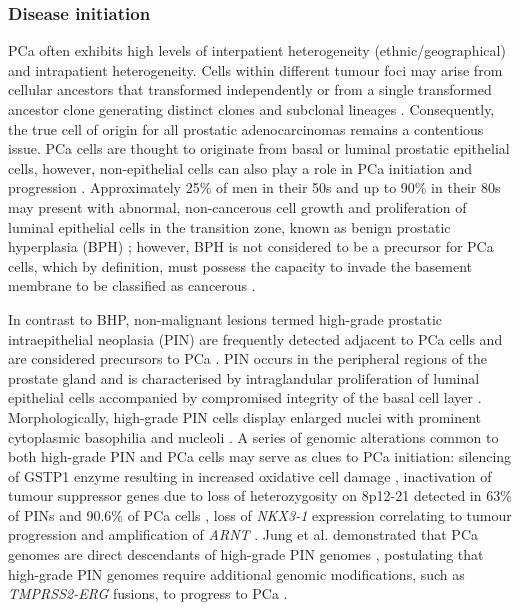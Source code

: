 \subsubsection{Disease initiation}
PCa often exhibits high levels of interpatient heterogeneity (ethnic/geographical) and intrapatient heterogeneity. Cells within different tumour foci may arise from cellular ancestors that transformed independently or from a single transformed ancestor clone generating distinct clones and subclonal lineages \cite{Rebello2021Feb, Boyd2012Nov}. Consequently, the true cell of origin for all prostatic adenocarcinomas remains a contentious issue. PCa cells are thought to originate from basal or luminal prostatic epithelial cells, however, non-epithelial cells can also play a role in PCa initiation and progression \cite{Goldstein2010Jul, Chua2014Sep, Lee2015Dec}. Approximately 25\% of men in their 50s and up to 90\% in their 80s may present with abnormal, non-cancerous cell growth and proliferation of luminal epithelial cells in the transition zone, known as benign prostatic hyperplasia (BPH) \cite{Bushman2009Nov}; however, BPH is not considered to be a precursor for PCa cells, which by definition, must possess the capacity to invade the basement membrane to be classified as cancerous \cite{Kristal2010May}. \par 
In contrast to BHP, non-malignant lesions termed high-grade prostatic intraepithelial neoplasia (PIN) are frequently detected adjacent to PCa cells and are considered precursors to PCa \cite{Rebello2021Feb}. PIN occurs in the peripheral regions of the prostate gland and is characterised by intraglandular proliferation of luminal epithelial cells accompanied by compromised integrity of the basal cell layer \cite{Ayala2007Aug, Bostwick2004}. Morphologically, high-grade PIN cells display enlarged nuclei with prominent cytoplasmic basophilia and nucleoli \cite{Bostwick2004Mar}. A series of genomic alterations common to both high-grade PIN and PCa cells may serve as clues to PCa initiation: silencing of GSTP1 enzyme resulting in increased oxidative cell damage \cite{Lee1994Nov}, inactivation of tumour suppressor genes due to loss of heterozygosity on 8p12-21 detected in 63\% of PINs and 90.6\% of PCa cells \cite{Emmert-Buck1995Jul}, loss of \textit{NKX3-1} expression correlating to tumour progression \cite{Asatiani2005Feb} and amplification of \textit{ARNT} \cite{Kim2013Feb}. Jung et al. demonstrated that PCa genomes are direct descendants of high-grade PIN genomes \cite{Jung2016May}, postulating that high-grade PIN genomes require additional genomic modifications, such as \textit{TMPRSS2-ERG} fusions, to progress to PCa \cite{Fraser2017}. \par

